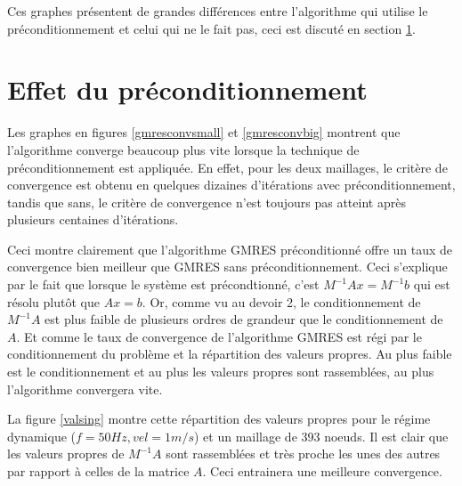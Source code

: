 \documentclass[11pt]{article}
\begin{document}
Ces graphes présentent de grandes différences entre l'algorithme qui utilise le préconditionnement et celui qui ne le fait pas, ceci est discuté en section \ref{precsec}.
\vspace{-10pt}
\section{Effet du préconditionnement}\label{precsec}
\vspace{-10pt}
Les graphes en figures \ref{gmresconvsmall} et \ref{gmresconvbig} montrent que l'algorithme converge beaucoup plus vite lorsque la technique de préconditionnement est appliquée. En effet, pour les deux maillages, le critère de convergence est obtenu en quelques dizaines d'itérations avec préconditionnement, tandis que sans, le critère de convergence n'est toujours pas atteint après plusieurs centaines d'itérations. \\
\vspace{-8pt}

Ceci montre clairement que l'algorithme GMRES préconditionné offre un taux de convergence bien meilleur que GMRES sans préconditionnement. Ceci s'explique par le fait que lorsque le système est précondtionné, c'est $M^{-1}A x = M^{-1}b$ qui est résolu plutôt que $A x = b$. Or, comme vu au devoir 2, le conditionnement de $M^{-1}A$ est plus faible de plusieurs ordres de grandeur que le conditionnement de $A$. Et comme le taux de convergence de l'algorithme GMRES est régi par le conditionnement du problème et la répartition des valeurs propres. Au plus faible est le conditionnement et au plus les valeurs propres sont rassemblées, au plus l'algorithme convergera vite. \\
\vspace{-8pt}

La figure \ref{valsing} montre cette répartition des valeurs propres pour le régime dynamique ($f = 50Hz, vel = 1m/s$) et un maillage de 393 noeuds.  Il est clair que les valeurs propres de $M^{-1} A$ sont rassemblées et très proche les unes des autres par rapport à celles de la matrice $A$. Ceci entrainera une meilleure convergence.
\vspace{-10pt}
\end{document}
